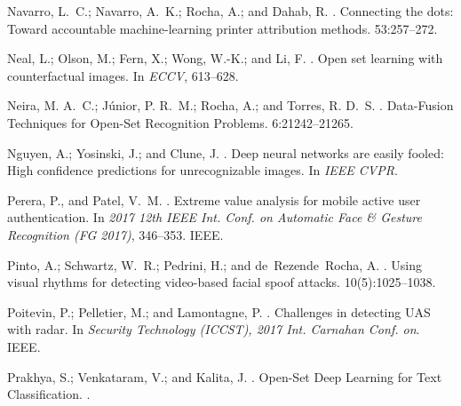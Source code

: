 \documentclass[letterpaper]{article}
\begin{document}
\begin{thebibliography}{}
Navarro, L.~C.; Navarro, A.~K.; Rocha, A.; and Dahab, R.
.
\newblock Connecting the dots: {Toward} accountable machine-learning printer
  attribution methods.
  53:257--272.

Neal, L.; Olson, M.; Fern, X.; Wong, W.-K.; and Li, F.
.
\newblock Open set learning with counterfactual images.
\newblock In {\em ECCV},  613--628.

Neira, M. A.~C.; Júnior, P. R.~M.; Rocha, A.; and Torres, R. D.~S.
.
\newblock Data-{Fusion} {Techniques} for {Open}-{Set} {Recognition} {Problems}.
 6:21242--21265.

Nguyen, A.; Yosinski, J.; and Clune, J.
.
\newblock Deep neural networks are easily fooled: High confidence predictions
  for unrecognizable images.
\newblock In {\em IEEE CVPR}.

Perera, P., and Patel, V.~M.
.
\newblock Extreme value analysis for mobile active user authentication.
\newblock In {\em 2017 12th {IEEE} {Int.} {Conf.} on {Automatic} {Face} \&
  {Gesture} {Recognition} ({FG} 2017)},  346--353.
\newblock IEEE.

Pinto, A.; Schwartz, W.~R.; Pedrini, H.; and de~Rezende~Rocha, A.
.
\newblock Using visual rhythms for detecting video-based facial spoof attacks.
  10(5):1025--1038.

Poitevin, P.; Pelletier, M.; and Lamontagne, P.
.
\newblock Challenges in detecting {UAS} with radar.
\newblock In {\em Security {Technology} ({ICCST}), 2017 {Int.} {Carnahan}
  {Conf.} on}.
\newblock IEEE.

Prakhya, S.; Venkataram, V.; and Kalita, J.
.
\newblock Open-{Set} {Deep} {Learning} for {Text} {Classification}.
.


\end{thebibliography}
\end{document}

